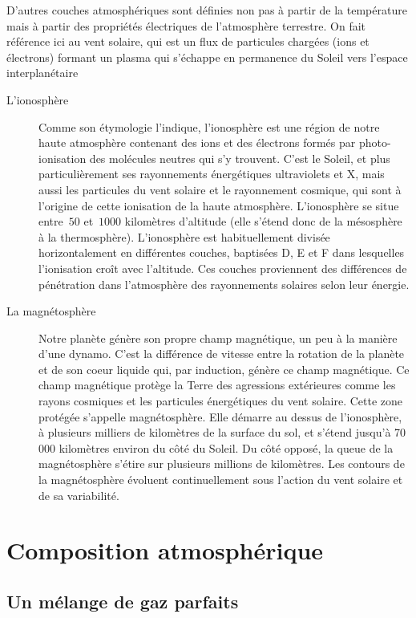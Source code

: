 \sk
\footnotesize
D'autres couches atmosphériques sont définies non pas à partir de la température mais à partir des propriétés électriques de l'atmosphère terrestre. On fait référence ici au vent solaire, qui est un flux de particules chargées (ions et électrons) formant un plasma qui s’échappe en permanence du Soleil vers l’espace interplanétaire
\begin{description}
\item[L'ionosphère] Comme son étymologie l'indique, l’ionosphère est une région de notre haute atmosphère contenant des ions et des électrons formés par photo-ionisation des molécules neutres qui s’y trouvent. C’est le Soleil, et plus particulièrement ses rayonnements énergétiques ultraviolets et X, mais aussi les particules du vent solaire et le rayonnement cosmique, qui sont à l’origine de cette ionisation de la haute atmosphère. L’ionosphère se situe entre~$50$ et~$1000$ kilomètres d’altitude (elle s'étend donc de la mésosphère à la thermosphère). L’ionosphère est habituellement divisée horizontalement en différentes couches, baptisées D, E et F dans lesquelles l’ionisation croît avec l’altitude. Ces couches proviennent des différences de pénétration dans l’atmosphère des rayonnements solaires selon leur énergie.
\item[La magnétosphère] Notre planète génère son propre champ magnétique, un peu à la manière d’une dynamo. C’est la différence de vitesse entre la rotation de la planète et de son coeur liquide qui, par induction, génère ce champ magnétique. Ce champ magnétique protège la Terre des agressions extérieures comme les rayons cosmiques et les particules énergétiques du vent solaire. Cette zone protégée s'appelle magnétosphère. Elle démarre au dessus de l’ionosphère, à plusieurs milliers de kilomètres de la surface du sol, et s’étend jusqu’à 70 000 kilomètres environ du côté du Soleil. Du côté opposé, la queue de la magnétosphère s’étire sur plusieurs millions de kilomètres. Les contours de la magnétosphère évoluent continuellement sous l’action du vent solaire et de sa variabilité.
\end{description}
\normalsize

\mk \section{Composition atmosphérique}
	
	\sk \subsection{Un mélange de gaz parfaits}
	

